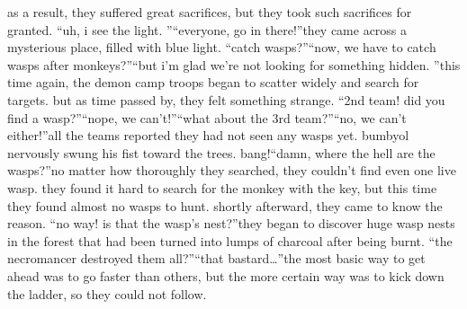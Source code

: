 as a result, they suffered great sacrifices, but they took such sacrifices for granted.
“uh, i see the light.
”“everyone, go in there!”they came across a mysterious place, filled with blue light.
“catch wasps?”“now, we have to catch wasps after monkeys?”“but i’m glad we’re not looking for something hidden.
”this time again, the demon camp troops began to scatter widely and search for targets.
but as time passed by, they felt something strange.
“2nd team! did you find a wasp?”“nope, we can’t!”“what about the 3rd team?”“no, we can’t either!”all the teams reported they had not seen any wasps yet.
bumbyol nervously swung his fist toward the trees.
bang!“damn, where the hell are the wasps?”no matter how thoroughly they searched, they couldn’t find even one live wasp.
they found it hard to search for the monkey with the key, but this time they found almost no wasps to hunt.
shortly afterward, they came to know the reason.
“no way! is that the wasp’s nest?”they began to discover huge wasp nests in the forest that had been turned into lumps of charcoal after being burnt.
“the necromancer destroyed them all?”“that bastard…”the most basic way to get ahead was to go faster than others, but the more certain way was to kick down the ladder, so they could not follow.


 